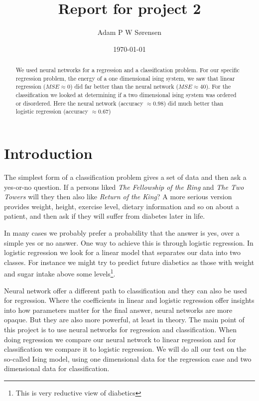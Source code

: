 \documentclass[parskip=half]{scrartcl}
\title{Report for project 2}
\date{\today}
\author{Adam P W S{\o}rensen}
\theoremstyle{definition}
\theoremstyle{remark}
\begin{document}

\maketitle

\begin{abstract}
We used neural networks for a regression and a classification problem. 
For our specific regression problem, the energy of a one dimensional ising system, we saw that linear regression ($MSE \approx 0$) did far better than the neural network ($MSE \approx 40$).
For the classification we looked at determining if a  two dimensional ising system was ordered or disordered. 
Here the neural network (accuracy $\approx 0.98$) did much better than logistic regression (accuracy $\approx 0.67$)
\end{abstract}


\section{Introduction}

The simplest form of a classification problem gives a set of data and then ask a yes-or-no question. 
If a persons liked \emph{The Fellowship of the Ring} and \emph{The Two Towers} will they then also like \emph{Return of the King}?
A more serious version provides weight, height, exercise level, dietary information and so on about a patient, and then ask if they will suffer from diabetes later in life. 

In many cases we probably prefer a probability that the answer is yes, over a simple yes or no answer. 
One way to achieve this is through logistic regression.
In logistic regression we look for a linear model that separates our data into two classes. 
For instance we might try to predict future diabetics as those with weight and sugar intake above some levels\footnote{This is very reductive view of diabetics}. 

Neural network offer a different path to classification and they can also be used for regression. 
Where the coefficients in linear and logistic regression offer insights into how parameters matter for the final answer, neural networks are more opaque. 
But they are also more powerful, at least in theory. 
The main point of this project is to use neural networks for regression and classification. 
When doing regression we compare our neural network to linear regression and for classification we compare it to logistic regression. 
We will do all our test on the so-called Ising model, using one dimensional data for the regression case and two dimensional data for classification. 
\end{document}
